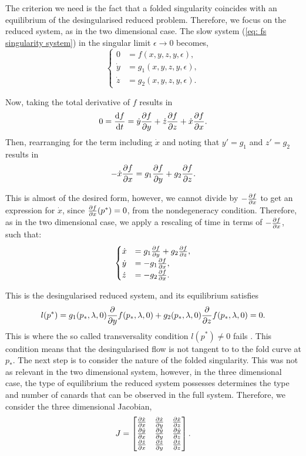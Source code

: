 The criterion we need is the fact that a folded singularity coincides with an equilibrium of the desingularised reduced problem. Therefore, we focus on the reduced system, as in the two dimensional case. The slow system (\ref{eq: fs singularity system}) in the singular limit $\epsilon \to 0$ becomes,
\begin{equation}
\begin{cases}
0 &=f(x,y,z,y,\epsilon),\\
\dot{y}&=g_1(x,y,z,y,\epsilon),\\
\dot{z}&=g_2(x,y,z,y,\epsilon).
\end{cases}\label{eq: fs singularity systemeps0}
\end{equation}

Now, taking the total derivative of $f$ results in
\begin{align*}
0 = \od{f}{t} =\dot{y}\pd{f}{y}+\dot{z}\pd{f}{z} + \dot{x}\pd{f}{x}.
\end{align*}
Then, rearranging for the term including $\dot{x}$ and noting that $ y'=g_1 $ and $ z'=g_2 $ results in
\begin{align*}
-\dot{x}\pd{f}{x} = g_1 \pd{f}{y}+ g_2\pd{f}{z}.
\end{align*}

This is almost of the desired form, however, we cannot divide by $-\pd{f}{x}$ to get an expression for $\dot{x}$, since $\pd{f}{x}(p^*)=0$, from the nondegeneracy condition.
Therefore, as in the two dimensional case, we apply a rescaling of time in terms of $-\pd{f}{x}$, such that:
\begin{equation} \label{somegenericthreedim}
\begin{cases}
\dot{x}&=g_1\pd{f}{y}+g_2\pd{f}{z},\\
\dot{y}&=-g_1\pd{f}{x},\\
\dot{z}&=-g_2\pd{f}{x}.
\end{cases}
\end{equation}

This is the desingularised reduced system, and its equilibrium satisfies
\begin{align*}
l(p^*)= g_1(p_*,\lambda,0)\pd{}{y}f(p_*,\lambda,0)+g_2(p_*,\lambda,0)\pd{}{z}f(p_*,\lambda,0)=0.
\end{align*}
This is where the so called transversality condition $l(p^*) \neq 0$ fails \citep{Kuehn}. This condition means that the desingularised flow is not tangent to to the fold curve at $p_*$.
The next step is to consider the nature of the folded singularity. This was not as relevant in the two dimensional system, however, in the three dimensional case, the type of equilibrium the reduced system possesses determines the type and number of canards that can be observed in the full system.
Therefore, we consider the three dimensional Jacobian,
\begin{equation}
J=\begin{bmatrix}
\pd{\dot{x}}{x}&\pd{\dot{x}}{y}&\pd{\dot{x}}{z}\\
\pd{\dot{y}}{x}&\pd{\dot{y}}{y}&\pd{\dot{y}}{z}\\
\pd{\dot{z}}{x}&\pd{\dot{z}}{y}&\pd{\dot{z}}{z}\\
\end{bmatrix}.
\end{equation}

